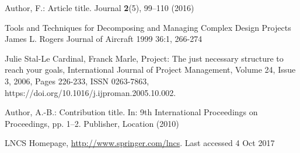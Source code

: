 \documentclass[runningheads]{llncs}
\begin{document}


%
\begin{thebibliography}{8}
Author, F.: Article title. Journal \textbf{2}(5), 99--110 (2016)

Tools and Techniques for Decomposing and Managing Complex Design Projects
James L. Rogers
Journal of Aircraft 1999 36:1, 266-274  

Julie Stal-Le Cardinal, Franck Marle,
Project: The just necessary structure to reach your goals,
International Journal of Project Management,
Volume 24, Issue 3,
2006,
Pages 226-233,
ISSN 0263-7863,
https://doi.org/10.1016/j.ijproman.2005.10.002.

Author, A.-B.: Contribution title. In: 9th International Proceedings
on Proceedings, pp. 1--2. Publisher, Location (2010)

LNCS Homepage, \url{http://www.springer.com/lncs}. Last accessed 4
Oct 2017
\end{thebibliography}
\end{document}
